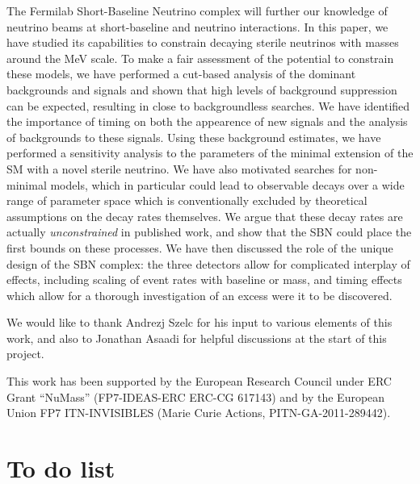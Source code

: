 \documentclass[11pt, a4paper]{article}
\begin{document}
The Fermilab Short-Baseline Neutrino complex will further our knowledge of
neutrino beams at short-baseline and neutrino interactions. In this paper, we
have studied its capabilities to constrain decaying sterile neutrinos with
masses around the MeV scale. To make a fair assessment of the potential to
constrain these models, we have performed a cut-based analysis of the dominant
backgrounds and signals and shown that high levels of background suppression
can be expected, resulting in close to backgroundless searches. We have
identified the importance of timing on both the appearence of new signals and
the analysis of backgrounds to these signals. Using these background estimates,
we have performed a sensitivity analysis to the parameters of the minimal
extension of the SM with a novel sterile neutrino. We have also motivated
searches for non-minimal models, which in particular could lead to observable
decays over a wide range of parameter space which is conventionally excluded by
theoretical assumptions on the decay rates themselves. We argue that these
decay rates are actually \emph{unconstrained} in published work, and show that
the SBN could place the first bounds on these processes. We have then discussed
the role of the unique design of the SBN complex: the three detectors allow for
complicated interplay of effects, including scaling of event rates with
baseline or mass, and timing effects which allow for a thorough investigation
of an excess were it to be discovered. 


\acknowledgments

We would like to thank Andrezj Szelc for his input to various elements of this
work, and also to Jonathan Asaadi for helpful discussions at the start of this
project.

This work has been supported by the European Research Council under ERC Grant
“NuMass” (FP7-IDEAS-ERC ERC-CG 617143) and by the European Union FP7
ITN-INVISIBLES (Marie Curie Actions, PITN-GA-2011-289442).

\appendix

\section{To do list}
\end{document}
